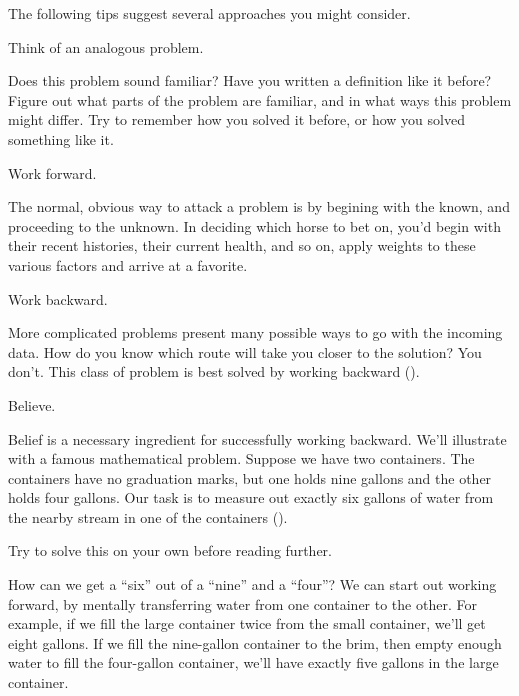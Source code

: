 The following tips suggest several approaches you might consider.
\begin{tip}
Think of an analogous problem.
\end{tip}
Does this problem sound familiar? Have you written a definition like it
before? Figure out what parts of the problem are familiar, and in what
ways this problem might differ. Try to remember how you solved it
before, or how you solved something like it.
\begin{tip}
Work forward.
\end{tip}
The normal, obvious way to attack a problem is by begining with the
known, and proceeding to the unknown. In deciding which horse to bet
on, you'd begin with their recent histories, their current health, and so on,
apply weights to these various factors and arrive at a favorite.
\begin{tip}
Work backward.
\end{tip}
More complicated problems present many possible ways to go with the
incoming data. How do you know which route will take you closer to the
solution? You don't. This class of problem is best solved by working
backward ().



\begin{tip}
Believe.
\end{tip}

Belief is a necessary ingredient for successfully working backward. We'll
illustrate with a famous mathematical problem. Suppose we have two
containers. The containers have no graduation marks, but one holds nine
gallons and the other holds four gallons. Our task is to measure out exactly
six gallons of water from the nearby stream in one of the containers
().




Try to solve this on your own before reading further.

How can we get a ``six'' out of a ``nine'' and a ``four''? We can start
out working forward, by mentally transferring water from one container
to the other. For example, if we fill the large container twice from the
small container, we'll get eight gallons. If we fill the nine-gallon container
to the brim, then empty enough water to fill the four-gallon container,
we'll have exactly five gallons in the large container.

